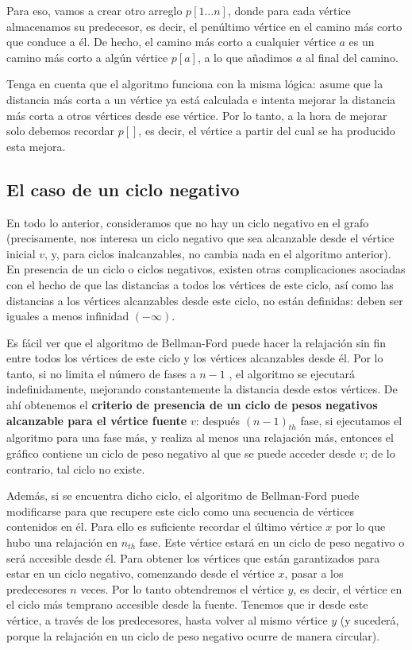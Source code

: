 Para eso, vamos a crear otro arreglo $p[1 \ldots n]$, donde para cada vértice almacenamos su predecesor, es decir, el penúltimo vértice en el camino más corto que conduce a él. De hecho, el camino más corto a cualquier vértice $a$ es un camino más corto a algún vértice $p[a]$, a lo que añadimos $a$ al final del camino.

Tenga en cuenta que el algoritmo funciona con la misma lógica: asume que la distancia más corta a un vértice ya está calculada e intenta mejorar la distancia más corta a otros vértices desde ese vértice. Por lo tanto, a la hora de mejorar solo debemos recordar $p[]$, es decir, el vértice a partir del cual se ha producido esta mejora.

\subsection{El caso de un ciclo negativo}

En todo lo anterior, consideramos que no hay un ciclo negativo en el grafo (precisamente, nos interesa un ciclo negativo que sea alcanzable desde el vértice inicial $v$, y, para ciclos inalcanzables, no cambia nada en el algoritmo anterior). En presencia de un ciclo o ciclos negativos, existen otras complicaciones asociadas con el hecho de que las distancias a todos los vértices de este ciclo, así como las distancias a los vértices alcanzables desde este ciclo, no están definidas: deben ser iguales a menos infinidad $(-\infty)$.

Es fácil ver que el algoritmo de Bellman-Ford puede hacer la relajación sin fin entre todos los vértices de este ciclo y los vértices alcanzables desde él. Por lo tanto, si no limita el número de fases a $n-1$ , el algoritmo se ejecutará indefinidamente, mejorando constantemente la distancia desde estos vértices. De ahí obtenemos el \textbf{criterio de presencia de un ciclo de pesos negativos alcanzable para el vértice fuente} $v$: después $(n-1)_{th}$ fase, si ejecutamos el algoritmo para una fase más, y realiza al menos una relajación más, entonces el gráfico contiene un ciclo de peso negativo al que se puede acceder desde $v$; de lo contrario, tal ciclo no existe.

Además, si se encuentra dicho ciclo, el algoritmo de Bellman-Ford puede modificarse para que 
recupere este ciclo como una secuencia de vértices contenidos en él. Para ello es suficiente 
recordar el último vértice $x$ por lo que hubo una relajación en $n_{th}$ fase. Este vértice estará 
en un ciclo de peso negativo o será accesible desde él. Para obtener los vértices que están 
garantizados para estar en un ciclo negativo, comenzando desde el vértice $x$, pasar a los 
predecesores $n$ veces. Por lo tanto obtendremos el vértice $y$, es decir, el vértice en el ciclo 
más temprano accesible desde la fuente. Tenemos que ir desde este vértice, a través de los 
predecesores, hasta volver al mismo vértice $y$ (y sucederá, porque la relajación en un ciclo de 
peso negativo ocurre de manera circular).